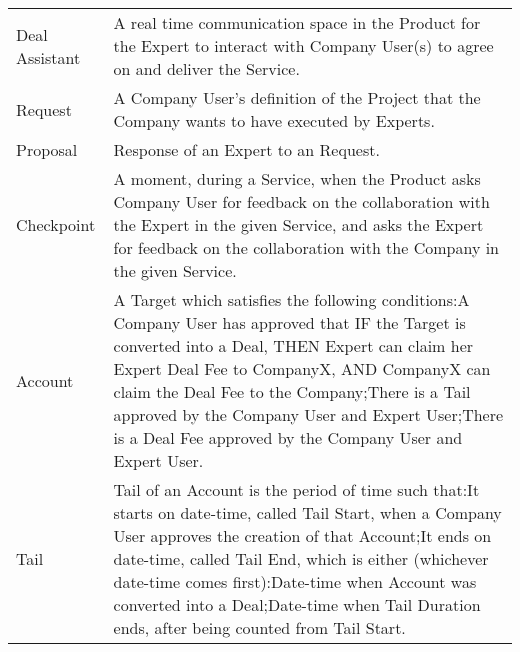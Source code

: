 \begin{longtable}{lp{7.5cm}}
Deal Assistant             & A real time communication space in the Product for the Expert to interact with Company User(s) to agree on and deliver the Service.                                                                                                                                                                                                                                       \\
Request                    & A Company User’s definition of the Project that the Company wants to have executed by Experts.                                                                                                                                                                                                                                                                            \\
Proposal                   & Response of an Expert to an Request.                                                                                                                                                                                                                                                                                                                                      \\
Checkpoint                 & A moment, during a Service, when the Product asks Company User for feedback on the collaboration with the Expert in the given Service, and asks the Expert for feedback on the collaboration with the Company in the given Service.                                                                                                                                       \\
Account                    & A Target which satisfies the following conditions:A Company User has approved that IF the Target is converted into a Deal, THEN Expert can claim her Expert Deal Fee to CompanyX, AND CompanyX can claim the Deal Fee to the Company;There is a Tail approved by the Company User and Expert User;There is a Deal Fee approved by the Company User and Expert User.       \\
Tail                       & Tail of an Account is the period of time such that:It starts on date-time, called Tail Start, when a Company User approves the creation of that Account;It ends on date-time, called Tail End, which is either (whichever date-time comes first):Date-time when Account was converted into a Deal;Date-time when Tail Duration ends, after being counted from Tail Start. \\

\end{longtable}
